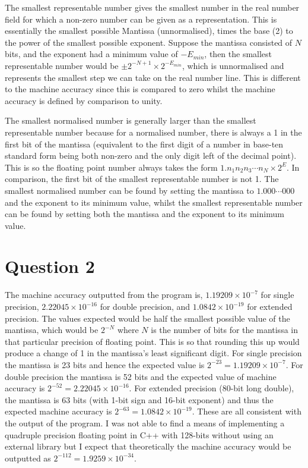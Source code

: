 \documentclass{article}
\begin{document}
The smallest representable number gives the smallest number in the real number field for which a non-zero number can be given as a representation. This is essentially the smallest possible Mantissa (unnormalised), times the base (2) to the power of the smallest possible exponent. Suppose the mantissa consisted of $N$ bits, and the exponent had a minimum value of $-E_{min}$, then the smallest representable number would be $\pm 2^{-N+1}\times{2^{-E_{min}}}$, which is unnormalised and represents the smallest step we can take on the real number line. This is different to the machine accuracy since this is compared to zero whilst the machine accuracy is defined by comparison to unity. 

The smallest normalised number is generally larger than the smallest representable number because for a normalised number, there is always a 1 in the first bit of the mantissa (equivalent to the first digit of a number in base-ten standard form being both non-zero and the only digit left of the decimal point). This is so the floating point number always takes the form $1.n_1n_2n_3\cdots{n_N}\times2^{E}$. In comparison, the first bit of the smallest representable number is not 1. The smallest normalised number can be found by setting the mantissa to $1.000\cdots{000}$ and the exponent to its minimum value, whilst the smallest representable number can be found by setting both the mantissa and the exponent to its minimum value. 
\newline

\section{Question 2}

The machine accuracy outputted from the program is, $1.19209\times{10^{-7}}$ for single precision,  $2.22045\times{10^{-16}}$ for double precision, and $1.0842\times{10^{-19}}$ for extended precision. The values expected would be half the smallest possible value of the mantissa, which would be $2^{-N}$ where $N$ is the number of bits for the mantissa in that particular precision of floating point. This is so that rounding this up would produce a change of 1 in the mantissa’s least significant digit. For single precision the mantissa is 23 bits and hence the expected value is $2^{-23}=1.19209\times{10^{-7}}$. For double precision the mantissa is 52 bits and the expected value of machine accuracy is $2^{-52}=2.22045\times{10^{-16}}$. For extended precision (80-bit long double), the mantissa is 63 bits (with 1-bit sign and 16-bit exponent) and thus the expected machine accuracy is  $2^{-63}=1.0842\times{10^{-19}}$. These are all consistent with the output of the program. I was not able to find a means of implementing a quadruple precision floating point in C++ with 128-bits without using an external library but I expect that theoretically the machine accuracy would be outputted as $2^{-112}=1.9259\times{10^{-34}}$.
\end{document}
